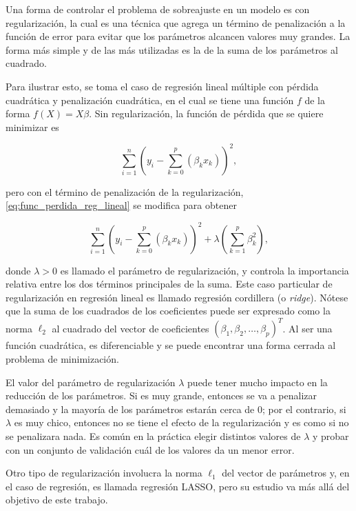 Una forma de controlar el problema de sobreajuste en un modelo es con regularización, la cual es una técnica que agrega un término de penalización a la función de error para evitar que los parámetros alcancen valores muy grandes. La forma más simple y de las más utilizadas es la de la suma de los parámetros al cuadrado. 

Para ilustrar esto, se toma el caso de regresión lineal múltiple con pérdida cuadrática y penalización cuadrática, en el cual se tiene una función $f$ de la forma $f(X) = X \beta$. Sin regularización, la función de pérdida que se quiere minimizar es

\begin{equation}
  \label{eq:func_perdida_reg_lineal}
  \sum_{i = 1}^n{ \left( y_i - \sum_{k = 0}^p \left( \beta_k x_k \right) \right) ^ 2},
\end{equation}

pero con el término de penalización de la regularización, \ref{eq:func_perdida_reg_lineal} se modifica para obtener

\begin{equation}
  \label{eq:func_perdida_reg_lineal_reg}
  \sum_{i = 1}^n{ \left( y_i - \sum_{k = 0}^p \left( \beta_k x_k \right) \right) ^ 2} 
  + \lambda \left( \sum_{k = 1}^p \beta_k^2 \right),
\end{equation}

donde $\lambda > 0$ es llamado el parámetro de regularización, y controla la importancia relativa entre los dos términos principales de la suma. Este caso particular de regularización en regresión lineal es llamado regresión cordillera (o \textit{ridge}). Nótese que la suma de los cuadrados de los coeficientes puede ser expresado como la norma $\ell_2$ al cuadrado del vector de coeficientes $\left( \beta_1, \beta_2, \hdots, \beta_p \right)^T$. Al ser una función cuadrática, es diferenciable y se puede encontrar una forma cerrada al problema de minimización.

El valor del parámetro de regularización $\lambda$ puede tener mucho impacto en la reducción de los parámetros. Si es muy grande, entonces se va a penalizar demasiado y la mayoría de los parámetros estarán cerca de 0; por el contrario, si $\lambda$ es muy chico, entonces no se tiene el efecto de la regularización y es como si no se penalizara nada. Es común en la práctica elegir distintos valores de $\lambda$ y probar con un conjunto de validación cuál de los valores da un menor error.

Otro tipo de regularización involucra la norma $\ell_1$ del vector de parámetros y, en el caso de regresión, es llamada regresión LASSO, pero su estudio va más allá del objetivo de este trabajo.

